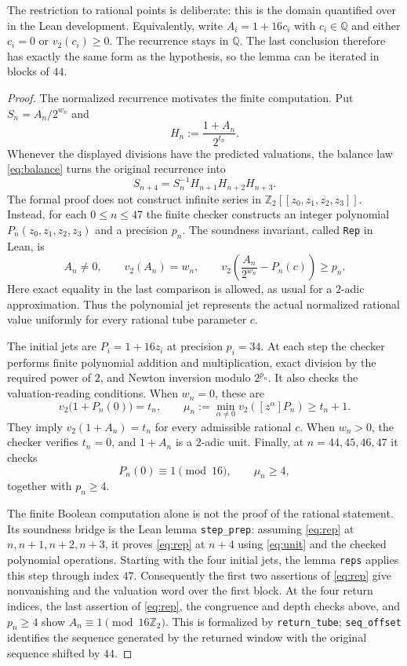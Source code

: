 \documentclass[11pt]{article}
\theoremstyle{remark}
\newcommand{\Q}{\mathbb{Q}}
\newcommand{\Ztwo}{\mathbb{Z}_2}
\newcommand{\vt}{v_2}
\begin{document}
The restriction to rational points is deliberate: this is the domain quantified
over in the Lean development.  Equivalently, write
$A_i=1+16c_i$ with $c_i\in\Q$ and either $c_i=0$ or $\vt(c_i)\ge0$.
The recurrence stays in $\Q$.  The last conclusion therefore has exactly the
same form as the hypothesis, so the lemma can be iterated in blocks of $44$.

\begin{proof}
The normalized recurrence motivates the finite computation.  Put
$S_n=A_n/2^{w_n}$ and
\[
H_n:=\frac{1+A_n}{2^{t_n}}.
\]
Whenever the displayed divisions have the predicted valuations, the balance
law \eqref{eq:balance} turns the original recurrence into
\begin{equation}
S_{n+4}=S_n^{-1}H_{n+1}H_{n+2}H_{n+3}.
\label{eq:unit}
\end{equation}
The formal proof does not construct infinite series in
$\Ztwo[[z_0,z_1,z_2,z_3]]$.  Instead, for each $0\le n\le47$ the finite checker
constructs an integer polynomial $P_n(z_0,z_1,z_2,z_3)$ and a precision $p_n$.
The soundness invariant, called \texttt{Rep} in Lean, is
\begin{equation}
A_n\ne0,\qquad
\vt(A_n)=w_n,\qquad
\vt\!\left(\frac{A_n}{2^{w_n}}-P_n(c)\right)\ge p_n.
\label{eq:rep}
\end{equation}
Here exact equality in the last comparison is allowed, as usual for a
$2$-adic approximation.  Thus the polynomial jet represents the actual
normalized rational value uniformly for every rational tube parameter $c$.

The initial jets are $P_i=1+16z_i$ at precision $p_i=34$.  At each step the
checker performs finite polynomial addition and multiplication, exact division
by the required power of $2$, and Newton inversion modulo $2^{p_n}$.  It also
checks the valuation-reading conditions.  When $w_n=0$, these are
\begin{equation}
\vt\!\bigl(1+P_n(0)\bigr)=t_n,
\qquad
\mu_n:=\min_{\alpha\ne0}\vt([z^\alpha]P_n)\ge t_n+1.
\label{eq:read}
\end{equation}
They imply $\vt(1+A_n)=t_n$ for every admissible rational $c$.  When $w_n>0$,
the checker verifies $t_n=0$, and $1+A_n$ is a $2$-adic unit.  Finally, at
$n=44,45,46,47$ it checks
\[
P_n(0)\equiv1\pmod{16},\qquad \mu_n\ge4,
\]
together with $p_n\ge4$.

The finite Boolean computation alone is not the proof of the rational
statement.  Its soundness bridge is the Lean lemma \texttt{step\_prep}: assuming
\eqref{eq:rep} at $n,n+1,n+2,n+3$, it proves \eqref{eq:rep} at $n+4$ using
\eqref{eq:unit} and the checked polynomial operations.  Starting with the four
initial jets, the lemma \texttt{reps} applies this step through index $47$.
Consequently the first two assertions of \eqref{eq:rep} give nonvanishing and
the valuation word over the first block.  At the four return indices, the last
assertion of \eqref{eq:rep}, the congruence and depth checks above, and
$p_n\ge4$ show $A_n\equiv1\pmod{16\Ztwo}$.  This is formalized by
\texttt{return\_tube}; \texttt{seq\_offset} identifies the sequence generated
by the returned window with the original sequence shifted by $44$.


\end{proof}
\end{document}
